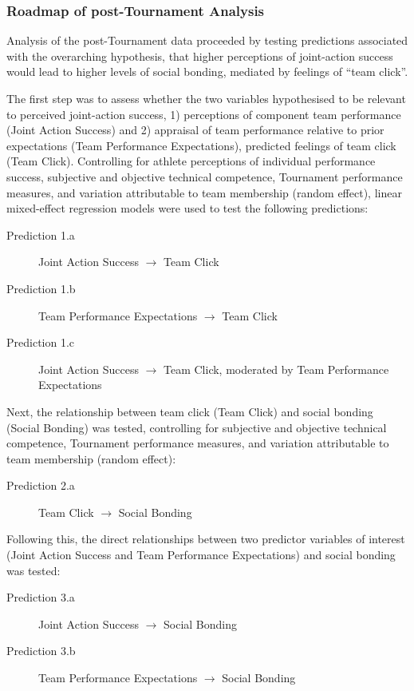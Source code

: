 \documentclass[12pt]{report}
\begin{document}
{\subsubsection{Roadmap of post-Tournament Analysis}
Analysis of the post-Tournament data proceeded by testing predictions associated with the overarching hypothesis, that higher perceptions of joint-action success would lead to higher levels of social bonding, mediated by feelings of ``team click''.

The first step was to assess whether the two variables hypothesised to be relevant to perceived joint-action success, 1) perceptions of component team performance (Joint Action Success) and 2) appraisal of team performance relative to prior expectations (Team Performance Expectations), predicted feelings of team click (Team Click). Controlling for athlete perceptions of individual performance success, subjective and objective technical competence, Tournament performance measures, and variation attributable to team membership (random effect), linear mixed-effect regression models were used to test the following predictions:

\begin{description}
  \item [Prediction 1.a] Joint Action Success  $\rightarrow$ Team Click
  \item [Prediction 1.b] Team Performance Expectations $\rightarrow$ Team Click
  \item [Prediction 1.c] Joint Action Success $\rightarrow$ Team Click, moderated by Team Performance Expectations
\end{description}

Next, the relationship between team click (Team Click) and social bonding (Social Bonding) was tested, controlling for subjective and objective technical competence, Tournament performance measures, and variation attributable to team membership (random effect):

\begin{description}
  \item [Prediction 2.a] Team Click $\rightarrow$ Social Bonding
\end{description}

Following this, the direct relationships between two predictor variables of interest (Joint Action Success and Team Performance Expectations) and social bonding was tested:

\begin{description}
  \item [Prediction 3.a] Joint Action Success $\rightarrow$ Social Bonding
  \item [Prediction 3.b] Team Performance Expectations $\rightarrow$ Social Bonding
\end{description}

}
\end{document}
